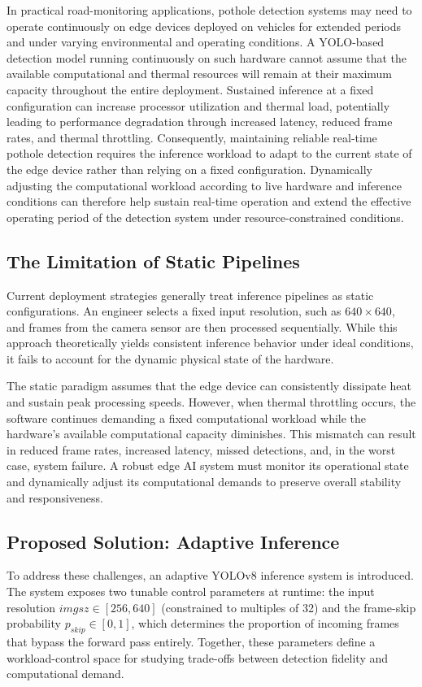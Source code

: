 \documentclass{ieeeaccess}
\begin{document}
In practical road-monitoring applications, pothole detection systems may need to operate continuously on edge devices deployed on vehicles for extended periods and under varying environmental and operating conditions. A YOLO-based detection model running continuously on such hardware cannot assume that the available computational and thermal resources will remain at their maximum capacity throughout the entire deployment. Sustained inference at a fixed configuration can increase processor utilization and thermal load, potentially leading to performance degradation through increased latency, reduced frame rates, and thermal throttling. Consequently, maintaining reliable real-time pothole detection requires the inference workload to adapt to the current state of the edge device rather than relying on a fixed configuration. Dynamically adjusting the computational workload according to live hardware and inference conditions can therefore help sustain real-time operation and extend the effective operating period of the detection system under resource-constrained conditions.

\subsection{The Limitation of Static Pipelines}
Current deployment strategies generally treat inference pipelines as static configurations. An engineer selects a fixed input resolution, such as $640 \times 640$, and frames from the camera sensor are then processed sequentially. While this approach theoretically yields consistent inference behavior under ideal conditions, it fails to account for the dynamic physical state of the hardware.

The static paradigm assumes that the edge device can consistently dissipate heat and sustain peak processing speeds. However, when thermal throttling occurs, the software continues demanding a fixed computational workload while the hardware's available computational capacity diminishes. This mismatch can result in reduced frame rates, increased latency, missed detections, and, in the worst case, system failure. A robust edge AI system must monitor its operational state and dynamically adjust its computational demands to preserve overall stability and responsiveness.

\subsection{Proposed Solution: Adaptive Inference}
To address these challenges, an adaptive YOLOv8 inference system is introduced. The system exposes two tunable control parameters at runtime: the input resolution $imgsz \in [256, 640]$ (constrained to multiples of 32) and the frame-skip probability $p_{skip} \in [0, 1]$, which determines the proportion of incoming frames that bypass the forward pass entirely. Together, these parameters define a workload-control space for studying trade-offs between detection fidelity and computational demand.
\end{document}
